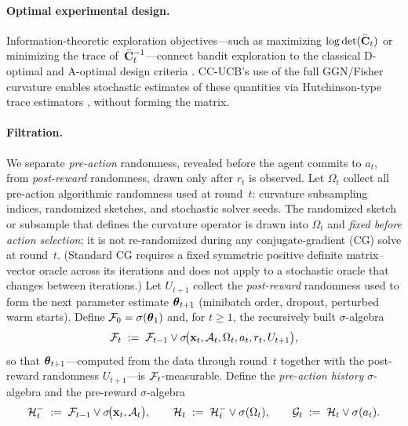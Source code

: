 \documentclass[twoside]{article}
\newcommand{\cHist}{\mathcal{H}}                %
\begin{document}
\paragraph{Optimal experimental design.}
Information-theoretic exploration objectives---such as maximizing
$\log\det(\bar{\mathbf{C}}_t)$ or minimizing the trace of~$\bar{\mathbf{C}}_t^{-1}$---connect
bandit exploration to the classical D-optimal and A-optimal design
criteria \citep{valko2013finite}.  CC-UCB's use of the full GGN/Fisher curvature
enables stochastic estimates of these quantities via Hutchinson-type trace
estimators \citep{ubaru2017fast}, without forming the matrix.



\paragraph{Filtration.}
We separate \emph{pre-action} randomness, revealed before the agent commits to
$a_t$, from \emph{post-reward} randomness, drawn only after $r_t$ is observed.
Let $\Omega_t$ collect all pre-action algorithmic randomness used at round~$t$:
curvature subsampling indices, randomized sketches, and stochastic solver seeds.
The randomized sketch or subsample that defines the curvature operator is drawn
into $\Omega_t$ and \emph{fixed before action selection}; it is not re-randomized
during any conjugate-gradient (CG) solve at round~$t$.  (Standard CG requires a
fixed symmetric positive definite matrix--vector oracle across its iterations and
does not apply to a stochastic oracle that changes between iterations.)
Let $U_{t+1}$ collect the \emph{post-reward} randomness used to form the next
parameter estimate $\boldsymbol{\theta}_{t+1}$ (minibatch order, dropout, perturbed warm
starts).
Define $\mathcal{F}_0 = \sigma(\boldsymbol{\theta}_1)$ and, for $t\ge 1$, the recursively built
$\sigma$-algebra
\begin{equation}\label{eq:filtration-F}
  \mathcal{F}_t \;:=\;
  \mathcal{F}_{t-1}\vee
  \sigma\!\bigl(\mathbf{x}_t,\mathcal{A}_t,\Omega_t,a_t,r_t,U_{t+1}\bigr),
\end{equation}
so that $\boldsymbol{\theta}_{t+1}$---computed from the data through round~$t$ together with
the post-reward randomness $U_{t+1}$---is $\mathcal{F}_t$-measurable.
Define the \emph{pre-action history} $\sigma$-algebra and the pre-reward
$\sigma$-algebra
\begin{equation}\label{eq:filtration}
  \cH_t^-\;:=\;\cF_{t-1}\vee\sigma\!\bigl(\bx_t,\cA_t\bigr),
  \qquad
  \cHist_t\;:=\;\cH_t^-\vee\sigma(\Omega_t),
  \qquad
  \cG_t \;:=\; \cHist_t\vee\sigma(a_t).
\end{equation}
\end{document}
